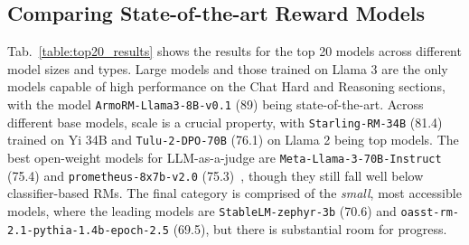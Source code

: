 \subsection{Comparing State-of-the-art Reward Models}
Tab.~\ref{table:top20_results} shows the results for the top 20 models across different model sizes and types.
Large models and those trained on Llama 3 are the only models capable of high performance on the Chat Hard and Reasoning sections, with the model \texttt{ArmoRM-Llama3-8B-v0.1} (89) being state-of-the-art.
Across different base models, scale is a crucial property, with \texttt{Starling-RM-34B} (81.4) trained on Yi 34B and \texttt{Tulu-2-DPO-70B} (76.1) on Llama 2 being top models.
The best open-weight models for LLM-as-a-judge are \texttt{Meta-Llama-3-70B-Instruct} (75.4) and \texttt{prometheus-8x7b-v2.0} (75.3)~\citep{kim2024prometheus}, though they still fall well below classifier-based RMs.
The final category is comprised of the {\it small}, most accessible models, where the leading models are \texttt{StableLM-zephyr-3b} (70.6) and \texttt{oasst-rm-2.1-pythia-1.4b-epoch-2.5} (69.5), but there is substantial room for progress.

